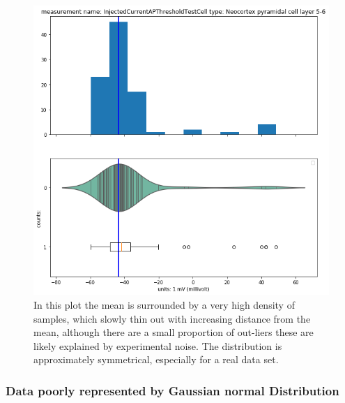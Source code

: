 \begin{figure} 
    \begin{center}   \includegraphics[scale=0.45]{figures/mean_well_served2.png}
    \end{center}
    \caption[Neuroelectro data set well served by normal distribution 2]{In this plot the mean is surrounded by a very high density of samples, which slowly thin out with increasing distance from the mean, although there are a small proportion of out-liers these are likely explained by experimental noise. The distribution is approximately symmetrical, especially for a real data set.}
\end{figure}   
 
\subsubsection{Data poorly represented by Gaussian normal Distribution}    

